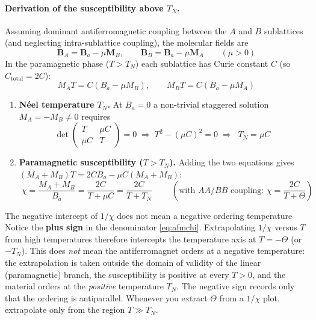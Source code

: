 \documentclass[11pt,a4paper]{article}
\newcommand{\vb}[1]{\mathbf{#1}}
\begin{document}
\paragraph{Derivation of the susceptibility above $T_N$.}
Assuming dominant antiferromagnetic coupling between the $A$ and $B$ sublattices (and neglecting intra-sublattice coupling), the molecular fields are
\begin{equation}
    \vb{B}_A = \vb{B}_a - \mu\vb{M}_B,
    \qquad
    \vb{B}_B = \vb{B}_a - \mu\vb{M}_A
    \qquad (\mu>0)
    \label{eq:afmfields}
\end{equation}
In the paramagnetic phase ($T>T_N$) each sublattice has Curie constant $C$ (so $C_{\mathrm{total}} = 2C$):
\begin{equation}
    M_A T = C(B_a - \mu M_B),
    \qquad
    M_B T = C(B_a - \mu M_A)
    \label{eq:afmeq}
\end{equation}
\begin{enumerate}[leftmargin=1.6cm]
    \item \textbf{N\'eel temperature $T_N$.} At $B_a = 0$ a non-trivial staggered solution $M_A = -M_B \neq 0$ requires
    \begin{equation}
        \det\begin{pmatrix}T & \mu C\\ \mu C & T\end{pmatrix} = 0
        \;\Longrightarrow\;
        T^2 - (\mu C)^2 = 0
        \;\Longrightarrow\;
        \boxed{\;T_N = \mu C\;}
        \label{eq:TN}
    \end{equation}
    \item \textbf{Paramagnetic susceptibility ($T>T_N$).} Adding the two equations gives $(M_A+M_B)T = 2CB_a - \mu C(M_A+M_B)$:
    \begin{equation}
        \boxed{\;\chi = \frac{M_A+M_B}{B_a} = \frac{2C}{T+\mu C} = \frac{2C}{T+T_N}\;}
        \qquad \left(\text{with $AA/BB$ coupling: } \chi = \frac{2C}{T+\Theta}\right)
        \label{eq:afmchi}
    \end{equation}
\end{enumerate}

\begin{pitfallbox}{The negative intercept of $1/\chi$ does not mean a negative ordering temperature}
Notice the \textbf{plus sign} in the denominator \eqref{eq:afmchi}. Extrapolating $1/\chi$ versus $T$ from high temperatures therefore intercepts the temperature axis at $T = -\Theta$ (or $-T_N$). This does \emph{not} mean the antiferromagnet orders at a negative temperature: the extrapolation is taken outside the domain of validity of the linear (paramagnetic) branch, the susceptibility is positive at every $T>0$, and the material orders at the \emph{positive} temperature $T_N$. The negative sign records only that the ordering is antiparallel. Whenever you extract $\Theta$ from a $1/\chi$ plot, extrapolate only from the region $T \gg T_N$.
\end{pitfallbox}
\end{document}
